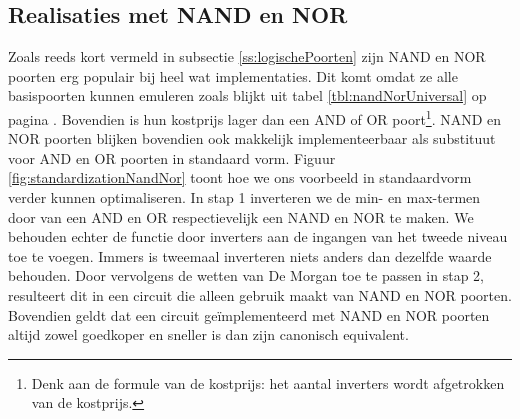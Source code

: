 \subsection{Realisaties met NAND en NOR}
Zoals reeds kort vermeld in subsectie \ref{ss:logischePoorten} zijn NAND en NOR poorten erg populair bij heel wat implementaties. Dit komt omdat ze alle basispoorten kunnen emuleren zoals blijkt uit tabel \ref{tbl:nandNorUniversal} op pagina \pageref{tbl:nandNorUniversal}. Bovendien is hun kostprijs lager dan een AND of OR poort\footnote{Denk aan de formule van de kostprijs: het aantal inverters wordt afgetrokken van de kostprijs.}. NAND en NOR poorten blijken bovendien ook makkelijk implementeerbaar als substituut voor AND en OR poorten in standaard vorm. Figuur \ref{fig:standardizationNandNor} toont hoe we ons voorbeeld in standaardvorm verder kunnen optimaliseren. In stap 1 inverteren we de min- en max-termen door van een AND en OR respectievelijk een NAND en NOR te maken. We behouden echter de functie door inverters aan de ingangen van het tweede niveau toe te voegen. Immers is tweemaal inverteren niets anders dan dezelfde waarde behouden. Door vervolgens de wetten van De Morgan toe te passen in stap 2, resulteert dit in een circuit die alleen gebruik maakt van NAND en NOR poorten. Bovendien geldt dat een circuit ge\"implementeerd met NAND en NOR poorten altijd zowel goedkoper en sneller is dan zijn canonisch equivalent.
